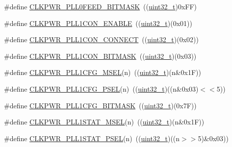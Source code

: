 \begin{DoxyCompactItemize}
\item 
\#define \hyperlink{group___c_l_k_p_w_r___private___macros_gae775dff1e028d9342f0798e4ffc3c490}{C\+L\+K\+P\+W\+R\+\_\+\+P\+L\+L0\+F\+E\+E\+D\+\_\+\+B\+I\+T\+M\+A\+SK}~((\hyperlink{_p_e___types_8h_a33594304e786b158f3fb30289278f5af}{uint32\+\_\+t})0x\+F\+F)
\item 
\#define \hyperlink{group___c_l_k_p_w_r___private___macros_ga887a9ce77348290efc9e3a7e97b1d2d5}{C\+L\+K\+P\+W\+R\+\_\+\+P\+L\+L1\+C\+O\+N\+\_\+\+E\+N\+A\+B\+LE}~((\hyperlink{_p_e___types_8h_a33594304e786b158f3fb30289278f5af}{uint32\+\_\+t})(0x01))
\item 
\#define \hyperlink{group___c_l_k_p_w_r___private___macros_ga37e9702988d0c7d33058372f9e679a73}{C\+L\+K\+P\+W\+R\+\_\+\+P\+L\+L1\+C\+O\+N\+\_\+\+C\+O\+N\+N\+E\+CT}~((\hyperlink{_p_e___types_8h_a33594304e786b158f3fb30289278f5af}{uint32\+\_\+t})(0x02))
\item 
\#define \hyperlink{group___c_l_k_p_w_r___private___macros_gae940d56cd95d9094750064ae5a8c9150}{C\+L\+K\+P\+W\+R\+\_\+\+P\+L\+L1\+C\+O\+N\+\_\+\+B\+I\+T\+M\+A\+SK}~((\hyperlink{_p_e___types_8h_a33594304e786b158f3fb30289278f5af}{uint32\+\_\+t})(0x03))
\item 
\#define \hyperlink{group___c_l_k_p_w_r___private___macros_ga6e139f032f79b7e1bed38975c976bd7d}{C\+L\+K\+P\+W\+R\+\_\+\+P\+L\+L1\+C\+F\+G\+\_\+\+M\+S\+EL}(n)~((\hyperlink{_p_e___types_8h_a33594304e786b158f3fb30289278f5af}{uint32\+\_\+t})(n\&0x1\+F))
\item 
\#define \hyperlink{group___c_l_k_p_w_r___private___macros_ga46ff76d399ebcd900f839ce8a9e72ad5}{C\+L\+K\+P\+W\+R\+\_\+\+P\+L\+L1\+C\+F\+G\+\_\+\+P\+S\+EL}(n)~((\hyperlink{_p_e___types_8h_a33594304e786b158f3fb30289278f5af}{uint32\+\_\+t})((n\&0x03)$<$$<$5))
\item 
\#define \hyperlink{group___c_l_k_p_w_r___private___macros_ga472f50c58e260b5095ba2ba2c051495e}{C\+L\+K\+P\+W\+R\+\_\+\+P\+L\+L1\+C\+F\+G\+\_\+\+B\+I\+T\+M\+A\+SK}~((\hyperlink{_p_e___types_8h_a33594304e786b158f3fb30289278f5af}{uint32\+\_\+t})(0x7\+F))
\item 
\#define \hyperlink{group___c_l_k_p_w_r___private___macros_ga40f54432e5861634b4079cbf35695724}{C\+L\+K\+P\+W\+R\+\_\+\+P\+L\+L1\+S\+T\+A\+T\+\_\+\+M\+S\+EL}(n)~((\hyperlink{_p_e___types_8h_a33594304e786b158f3fb30289278f5af}{uint32\+\_\+t})(n\&0x1\+F))
\item 
\#define \hyperlink{group___c_l_k_p_w_r___private___macros_ga65145a490898ae162755a9b446d57f41}{C\+L\+K\+P\+W\+R\+\_\+\+P\+L\+L1\+S\+T\+A\+T\+\_\+\+P\+S\+EL}(n)~((\hyperlink{_p_e___types_8h_a33594304e786b158f3fb30289278f5af}{uint32\+\_\+t})((n$>$$>$5)\&0x03))

\end{DoxyCompactItemize}
